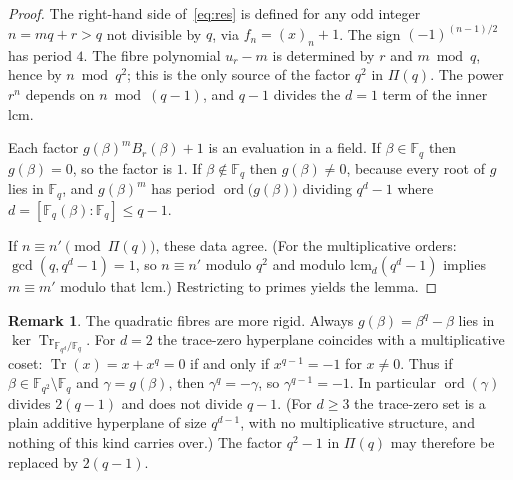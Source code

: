 \documentclass[11pt,a4paper]{amsart}
\newcommand{\F}{\mathbb{F}}
\theoremstyle{plain}
\theoremstyle{definition}
\newtheorem{remark}[theorem]{Remark}
\begin{document}
\begin{proof}
The right-hand side of~\eqref{eq:res} is defined for any odd integer \(n=mq+r>q\) not divisible by \(q\), via \(f_n=(x)_n+1\). The sign \((-1)^{(n-1)/2}\) has period \(4\). The fibre polynomial \(u_r-m\) is determined by \(r\) and \(m\bmod q\), hence by \(n\bmod q^2\); this is the only source of the factor \(q^2\) in \(\Pi(q)\). The power \(r^n\) depends on \(n\bmod(q-1)\), and \(q-1\) divides the \(d=1\) term of the inner lcm.

Each factor \(g(\beta)^m B_r(\beta)+1\) is an evaluation in a field. If \(\beta\in\F_q\) then \(g(\beta)=0\), so the factor is \(1\). If \(\beta\notin\F_q\) then \(g(\beta)\ne0\), because every root of \(g\) lies in \(\F_q\), and \(g(\beta)^m\) has period \(\operatorname{ord}\bigl(g(\beta)\bigr)\) dividing \(q^d-1\) where \(d=[\F_q(\beta):\F_q]\le q-1\).

If \(n\equiv n'\pmod{\Pi(q)}\), these data agree. (For the multiplicative orders: \(\gcd(q,q^d-1)=1\), so \(n\equiv n'\) modulo \(q^2\) and modulo \(\mathrm{lcm}_d(q^d-1)\) implies \(m\equiv m'\) modulo that lcm.) Restricting to primes yields the lemma.
\end{proof}

\begin{remark}
\label{rem:d2}
The quadratic fibres are more rigid. Always \(g(\beta)=\beta^q-\beta\) lies in \(\ker\operatorname{Tr}_{\F_{q^d}/\F_q}\). For \(d=2\) the trace-zero hyperplane coincides with a multiplicative coset: \(\operatorname{Tr}(x)=x+x^q=0\) if and only if \(x^{q-1}=-1\) for \(x\ne0\). Thus if \(\beta\in\F_{q^2}\setminus\F_q\) and \(\gamma=g(\beta)\), then \(\gamma^q=-\gamma\), so \(\gamma^{q-1}=-1\). In particular \(\operatorname{ord}(\gamma)\) divides \(2(q-1)\) and does not divide \(q-1\). (For \(d\ge3\) the trace-zero set is a plain additive hyperplane of size \(q^{d-1}\), with no multiplicative structure, and nothing of this kind carries over.) The factor \(q^2-1\) in \(\Pi(q)\) may therefore be replaced by \(2(q-1)\).
\end{remark}
\end{document}
